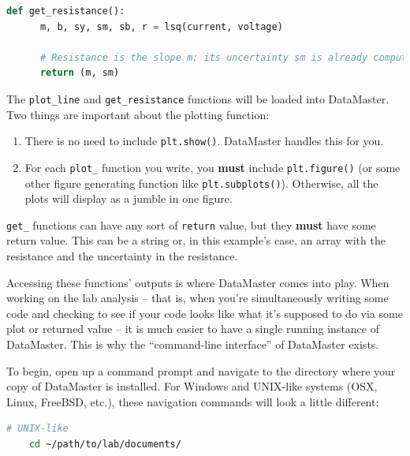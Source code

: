 \documentclass[12pt]{article}
\begin{document}
{\begin{framed}
\begin{lstlisting}[language=Python]
  def get_resistance():
      m, b, sy, sm, sb, r = lsq(current, voltage)

      # Resistance is the slope m; its uncertainty sm is already computed by lsq()
      return (m, sm)
  \end{lstlisting}
\end{framed}

The \texttt{plot\_line} and \texttt{get\_resistance} functions will be loaded into DataMaster. Two things are important about the plotting function:
\begin{enumerate}
  \item There is no need to include \texttt{plt.show()}. DataMaster handles this for you.
  \item For each \texttt{plot\_} function you write, you \textbf{must} include \texttt{plt.figure()} (or some other figure generating function like \texttt{plt.subplots()}). Otherwise, all the plots will display as a jumble in one figure.
\end{enumerate}

\texttt{get\_} functions can have any sort of \texttt{return} value, but they \textbf{must} have some return value. This can be a string or, in this example's case, an array with the resistance and the uncertainty in the resistance.

Accessing these functions' outputs is where DataMaster comes into play. When working on the lab analysis -- that is, when you're simultaneously writing some code and checking to see if your code looks like what it's supposed to do via some plot or returned value -- it is much easier to have a single running instance of DataMaster. This is why the ``command-line interface'' of DataMaster exists.

To begin, open up a command prompt and navigate to the directory where your copy of DataMaster is installed. For Windows and UNIX-like systems (OSX, Linux, FreeBSD, etc.), these navigation commands will look a little different:
\begin{framed}
  \begin{lstlisting}[language=sh]
    # UNIX-like
    cd ~/path/to/lab/documents/
    

\end{lstlisting}
\end{framed}}
\end{document}
